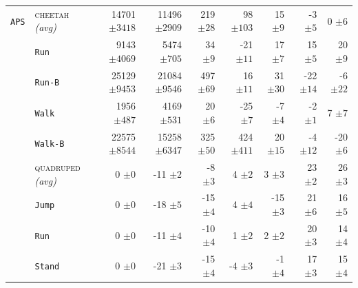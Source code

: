 \documentclass{article}
\theoremstyle{plain}
\theoremstyle{definition}
\theoremstyle{remark}
\newcommand{\domainavg}[1]{\textsc{#1} \textit{(avg)}}
\begin{document}
\begin{table}[H]
\begin{tabular}{l l r r r r r r r}
 \rowcolor{gray!15}  \cellcolor{white} \texttt{APS} &\domainavg{cheetah} & 14701 ${\scriptstyle \pm 3418}$ & 11496 ${\scriptstyle \pm 2909}$ & 219 ${\scriptstyle \pm 28}$ & 98 ${\scriptstyle \pm 103}$ & 15 ${\scriptstyle \pm 9}$ & -3 ${\scriptstyle \pm 5}$ & 0 ${\scriptstyle \pm 6}$ \\
& \hspace{.5em} \texttt{Run} & 9143 ${\scriptstyle \pm 4069}$ & 5474 ${\scriptstyle \pm 705}$ & 34 ${\scriptstyle \pm 9}$ & -21 ${\scriptstyle \pm 11}$ & 17 ${\scriptstyle \pm 7}$ & 15 ${\scriptstyle \pm 5}$ & 20 ${\scriptstyle \pm 9}$ \\
& \hspace{.5em} \texttt{Run-B} & 25129 ${\scriptstyle \pm 9453}$ & 21084 ${\scriptstyle \pm 9546}$ & 497 ${\scriptstyle \pm 69}$ & 16 ${\scriptstyle \pm 11}$ & 31 ${\scriptstyle \pm 30}$ & -22 ${\scriptstyle \pm 14}$ & -6 ${\scriptstyle \pm 22}$ \\
& \hspace{.5em} \texttt{Walk} & 1956 ${\scriptstyle \pm 487}$ & 4169 ${\scriptstyle \pm 531}$ & 20 ${\scriptstyle \pm 6}$ & -25 ${\scriptstyle \pm 7}$ & -7 ${\scriptstyle \pm 4}$ & -2 ${\scriptstyle \pm 1}$ & 7 ${\scriptstyle \pm 7}$ \\
& \hspace{.5em} \texttt{Walk-B} & 22575 ${\scriptstyle \pm 8544}$ & 15258 ${\scriptstyle \pm 6347}$ & 325 ${\scriptstyle \pm 50}$ & 424 ${\scriptstyle \pm 411}$ & 20 ${\scriptstyle \pm 15}$ & -4 ${\scriptstyle \pm 12}$ & -20 ${\scriptstyle \pm 6}$ \\
\addlinespace
 \rowcolor{gray!15}  \cellcolor{white} & \domainavg{quadruped} & 0 ${\scriptstyle \pm 0}$ & -11 ${\scriptstyle \pm 2}$ & -8 ${\scriptstyle \pm 3}$ & 4 ${\scriptstyle \pm 2}$ & 3 ${\scriptstyle \pm 3}$ & 23 ${\scriptstyle \pm 2}$ & 26 ${\scriptstyle \pm 3}$ \\
& \hspace{.5em} \texttt{Jump} & 0 ${\scriptstyle \pm 0}$ & -18 ${\scriptstyle \pm 5}$ & -15 ${\scriptstyle \pm 4}$ & 4 ${\scriptstyle \pm 4}$ & -15 ${\scriptstyle \pm 3}$ & 21 ${\scriptstyle \pm 6}$ & 16 ${\scriptstyle \pm 5}$ \\
& \hspace{.5em} \texttt{Run} & 0 ${\scriptstyle \pm 0}$ & -11 ${\scriptstyle \pm 4}$ & -10 ${\scriptstyle \pm 4}$ & 1 ${\scriptstyle \pm 2}$ & 2 ${\scriptstyle \pm 2}$ & 20 ${\scriptstyle \pm 3}$ & 14 ${\scriptstyle \pm 4}$ \\
& \hspace{.5em} \texttt{Stand} & 0 ${\scriptstyle \pm 0}$ & -21 ${\scriptstyle \pm 3}$ & -15 ${\scriptstyle \pm 4}$ & -4 ${\scriptstyle \pm 3}$ & -1 ${\scriptstyle \pm 4}$ & 17 ${\scriptstyle \pm 3}$ & 15 ${\scriptstyle \pm 4}$ \\

\end{tabular}
\end{table}
\end{document}
